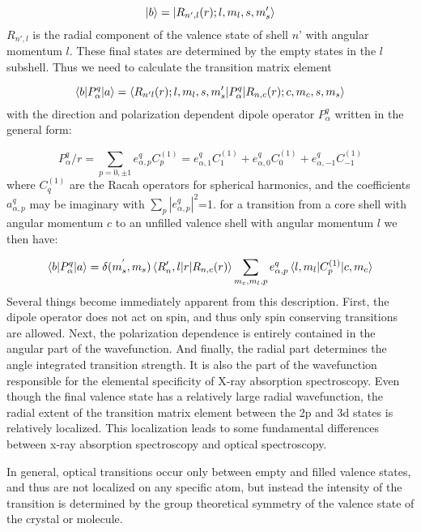 \begin{equation}
\ket{b}=\ket{R_{n',l}(r);l,m_l,s,m_s'}
\end{equation}
$R_{n',l}$ is the radial component of the valence state of shell $n$' with angular momentum $l$. These final  states are determined by the empty states in the $l$ subshell. Thus we need to calculate the transition matrix element

\begin{equation}
\braket{b|P_\alpha^q|a}=\braket{R_{n'l}(r);l,m_l,s,m_s'|P_\alpha^q|R_{n,c}(r);c,m_c,s,m_s}
\end{equation}
with the direction and polarization dependent dipole operator $P_\alpha^q$ written in the general form:

\begin{equation}
P_\alpha^q/r = \sum_{p=0,\pm 1}e_{\alpha,p}^qC_p^{(1)}=e_{\alpha,1}^qC_1^{(1)}+e_{\alpha,0}^qC_0^{(1)}+e_{\alpha,-1}^qC_{-1}^{(1)}
\end{equation}
where $C_q^{(1)}$ are the Racah operators for spherical harmonics, and the coefficients $a_{\alpha,p}^q$ may be imaginary with $\sum_p|e^q_{\alpha,p}|^2$=1. for a transition from a core shell with angular momentum $c$ to an unfilled valence shell with angular momentum $l$ we then have:

\begin{equation}
\braket{b|P_\alpha^q|a}=\delta(m_s^{'},m_s)\braket{R_n',l|r|R_{n,c}(r)}\sum_{m_c,m_l,p}e_{\alpha,p}^q\braket{l,m_l|C_p^{(1)}|c,m_c}
\end{equation}
Several things become immediately apparent from this description. First, the dipole operator does not act on spin, and thus only spin conserving transitions are allowed. Next, the polarization dependence is entirely contained in the angular part of the wavefunction. And finally, the radial part determines the angle integrated transition strength. It is also the part of the wavefunction responsible for the elemental specificity of X-ray absorption spectroscopy. Even though the final valence state has a relatively large radial wavefunction, the radial extent of the transition matrix element between the 2p and 3d states is relatively localized. This localization leads to some fundamental differences between x-ray absorption spectroscopy and optical spectroscopy.

In general, optical transitions occur only between empty and filled valence states, and thus are not localized on any specific atom, but instead the intensity of the transition is determined by the group theoretical symmetry of the valence state of the crystal or molecule.

